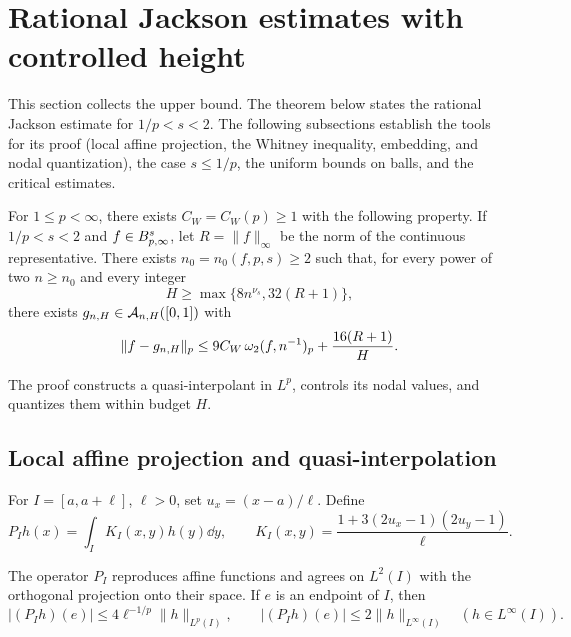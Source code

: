 \documentclass[11pt,a4paper]{article}
\begin{document}
\section{Rational Jackson estimates with controlled height}
\label{lp:sec:program}

This section collects the upper bound. The theorem below states the rational Jackson estimate for $1/p<s<2$. The following subsections establish the tools for its proof (local affine projection, the Whitney inequality, embedding, and nodal quantization), the case $s\le1/p$, the uniform bounds on balls, and the critical estimates.

\begin{teorema}
\label{lp:hyp:jackson}
For $1\le p<\infty$, there exists $C_W=C_W(p)\ge1$ with the following property. If $1/p<s<2$ and $f\in B^{s}_{p,\infty}$, let $R=\|f\|_\infty$ be the norm of the continuous representative. There exists $n_0=n_0(f,p,s)\ge2$ such that, for every power of two $n\ge n_0$ and every integer
\begin{equation}
 H\ge\max\{8n^{\nu_s},32(R+1)\},
 \label{lp:eq:height-threshold}
\end{equation}
there exists $g_{n,H}\in\mathcal A_{n,H}([0,1])$ with
\begin{equation}
 \|f-g_{n,H}\|_p\le9C_W\,\omega_2(f,n^{-1})_{p}+\frac{16(R+1)}{H}.
 \label{lp:eq:jackson-p}
\end{equation}
\end{teorema}

The proof constructs a quasi-interpolant in $L^p$, controls its nodal values, and quantizes them within budget $H$.

\subsection{Local affine projection and quasi-interpolation}

For $I=[a,a+\ell]$, $\ell>0$, set $u_x=(x-a)/\ell$. Define
\[
 P_I h(x)=\int_I K_I(x,y)h(y)\dd y,
 \qquad
 K_I(x,y)=\frac{1+3(2u_x-1)(2u_y-1)}{\ell}.
\]

\begin{lema}
\label{lp:lem:projection}
The operator $P_I$ reproduces affine functions and agrees on $L^2(I)$ with the orthogonal projection onto their space. If $e$ is an endpoint of $I$, then
\begin{equation}
 |(P_I h)(e)|\le4\ell^{-1/p}\|h\|_{L^p(I)},\qquad
 |(P_I h)(e)|\le2\|h\|_{L^\infty(I)}\quad(h\in L^\infty(I)).
 \label{lp:eq:projection-bounds}
\end{equation}
\end{lema}
\end{document}
